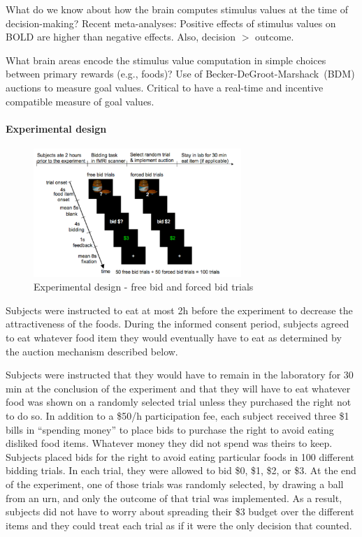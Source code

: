 \documentclass[12pt,article,oneside,a4paper]{memoir}
\begin{document}
What do we know about how the brain computes stimulus values at the time of
decision-making? Recent meta-analyses: Positive effects of stimulus values on
BOLD are higher than negative effects. Also, decision $>$ outcome.

What brain areas encode the stimulus value computation in simple choices between
primary rewards (e.g., foods)? Use of Becker-DeGroot-Marshack~(BDM) auctions to
measure goal values. Critical to have a real-time and incentive compatible
measure of goal values.

\paragraph{Experimental design}

\begin{figure}[h]
  \centering
  \includegraphics[width=0.7\textwidth]{imgs/experimental-design.png}
  \caption{Experimental design - free bid and forced bid trials}
  \label{fig:experimental-design}
\end{figure}

Subjects were instructed to eat at most 2h before the experiment to decrease
the attractiveness of the foods. During the informed consent period, subjects
agreed to eat whatever food item they would eventually have to eat as
determined by the auction mechanism described below.

Subjects were instructed that they would have to remain in the laboratory for
30 min at the conclusion of the experiment and that they will have to eat
whatever food was shown on a randomly selected trial unless they purchased the
right not to do so. In addition to a \$50/h participation fee, each subject
received three \$1 bills in ``spending money'' to place bids to purchase the
right to avoid eating disliked food items.
Whatever money they did not spend was theirs to keep. Subjects placed bids for
the right to avoid eating particular foods in 100 different bidding trials.
In each trial, they were allowed to bid \$0, \$1, \$2, or \$3. At the end of
the experiment, one of those trials was randomly selected, by drawing a ball
from an urn, and only the outcome of that trial was implemented.
As a result, subjects did not have to worry about spreading their \$3 budget
over the different items and they could treat each trial as if it were the only
decision that counted.
\end{document}
